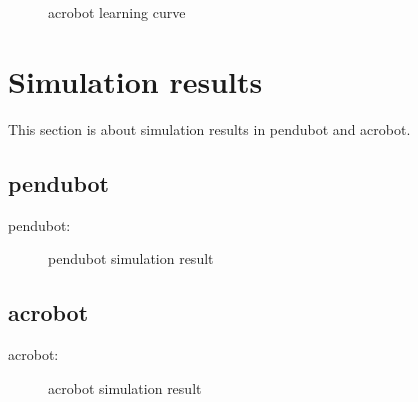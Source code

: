 \begin{figure}[htbp]
    \centering
    \caption{acrobot learning curve}
    \label{fig:image_b}
\end{figure}

\section{Simulation results}
This section is about simulation results in pendubot and acrobot.
\subsection{pendubot}
pendubot:
\begin{figure}[htbp]
    \centering
    \caption{pendubot simulation result}
    \label{fig:image_a}
\end{figure}

\subsection{acrobot}
acrobot:
\begin{figure}[htbp]
    \centering
    \caption{acrobot simulation result}
    \label{fig:image_b}
\end{figure}


\cleardoublepage
